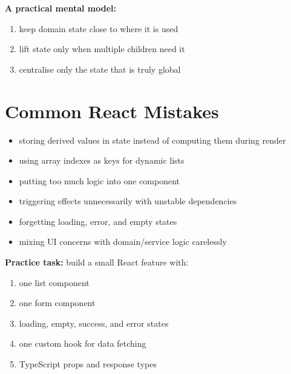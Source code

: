 \documentclass[12pt, a4paper, oneside]{book}
\begin{document}
\textbf{A practical mental model:}
\begin{enumerate}[leftmargin=2em]
    \item keep domain state close to where it is used
    \item lift state only when multiple children need it
    \item centralise only the state that is truly global
\end{enumerate}

\section{Common React Mistakes}

\begin{itemize}[leftmargin=2em]
    \item storing derived values in state instead of computing them during render
    \item using array indexes as keys for dynamic lists
    \item putting too much logic into one component
    \item triggering effects unnecessarily with unstable dependencies
    \item forgetting loading, error, and empty states
    \item mixing UI concerns with domain/service logic carelessly
\end{itemize}

\begin{exercisebox}
\textbf{Practice task:} build a small React feature with:
\begin{enumerate}[leftmargin=2em]
    \item one list component
    \item one form component
    \item loading, empty, success, and error states
    \item one custom hook for data fetching
    \item TypeScript props and response types
\end{enumerate}
\end{exercisebox}
\end{document}

